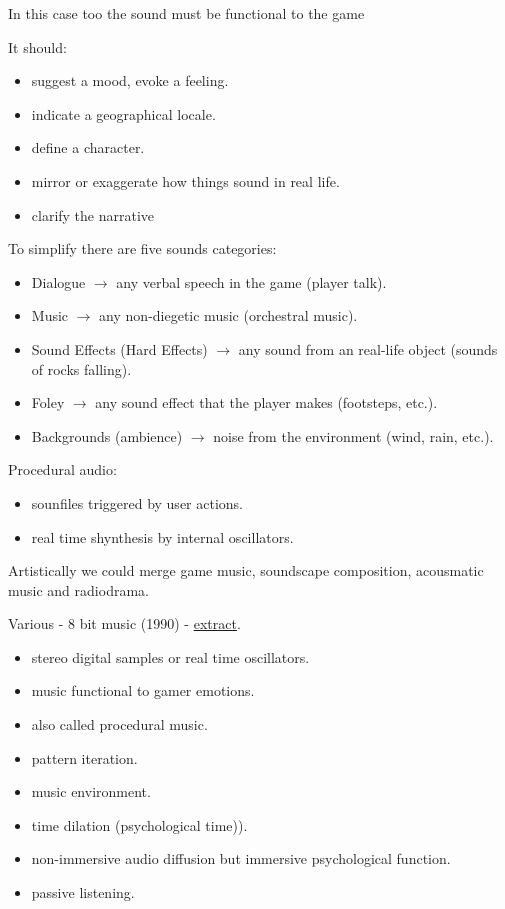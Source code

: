 In this case too the sound must be functional to the game

It should:

\begin{itemize}
\tightlist
\item suggest a mood, evoke a feeling.
\item indicate a geographical locale.
\item define a character.
\item mirror or exaggerate how things sound in real life.
\item clarify the narrative
\end{itemize}

To simplify there are five sounds categories:

\begin{itemize}
\tightlist
\item Dialogue \(\rightarrow\) any verbal speech in the game (player talk).
\item Music \(\rightarrow\) any non-diegetic music (orchestral music).
\item Sound Effects (Hard Effects) \(\rightarrow\) any sound from an real-life object (sounds of rocks falling).
\item Foley \(\rightarrow\) any sound effect that the player makes (footsteps, etc.).
\item Backgrounds (ambience) \(\rightarrow\) noise from the environment (wind, rain, etc.).
\end{itemize}

Procedural audio:

\begin{itemize}
\tightlist
\item sounfiles triggered by user actions.
\item real time shynthesis by internal oscillators.
\end{itemize}

Artistically we could merge game music, soundscape composition, acousmatic music and radiodrama.

Various - 8 bit music (1990) - \href{suoni/gaming.mp3}{extract}.

\begin{itemize}
\tightlist
\item stereo digital samples or real time oscillators.
\item music functional to gamer emotions.
\item also called procedural music.
\item pattern iteration.
\item music environment.
\item time dilation (psychological time)).
\item non-immersive audio diffusion but immersive psychological function.
\item passive listening.
\end{itemize}

